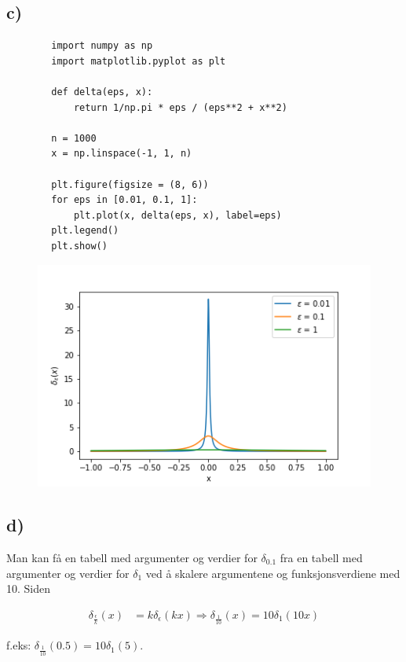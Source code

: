 \documentclass[norsk,a4paper,12pt]{article}
\begin{document}
	\subsection*{c)}
	\begin{verbatim}
		import numpy as np
		import matplotlib.pyplot as plt
		
		def delta(eps, x):
			return 1/np.pi * eps / (eps**2 + x**2)
		
		n = 1000
		x = np.linspace(-1, 1, n)
		
		plt.figure(figsize = (8, 6))
		for eps in [0.01, 0.1, 1]:
			plt.plot(x, delta(eps, x), label=eps)
		plt.legend()
		plt.show()
	\end{verbatim}

	\begin{figure}[H]
		\includegraphics[width=150mm]{../16bfig.PNG}
	\end{figure}
	
	\subsection*{d)}
	Man kan få en tabell med argumenter og verdier for $\delta_{0.1}$ fra en tabell med argumenter og verdier for $\delta_{1}$ ved å skalere argumentene og funksjonsverdiene med 10. Siden
	
	\begin{equation}
	\begin{aligned}
	\delta_\frac{\epsilon}{k}(x) &= k \delta_\epsilon(kx) \Rightarrow \delta_{\frac{1}{10}}(x) = 10 \delta_1(10x)
	\end{aligned}
	\end{equation}
	
	f.eks: $\delta_{\frac{1}{10}}(0.5) = 10 \delta_1(5)$.
	
\end{document}
